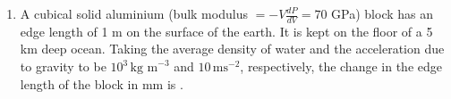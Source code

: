 
\begin{enumerate}
    \item A cubical solid aluminium (bulk modulus $= -V \frac{dP}{dV} = 70$ GPa) block has an edge length of 1 m on the surface of the earth. It is kept on the floor of a 5 km deep ocean. Taking the average density of water and the acceleration due to gravity to be $10^3 \, \text{kg m}^{-3}$ and $10 \, \text{ms}^{-2}$, respectively, the change in the edge length of the block in mm is \underline{\hspace{3cm}}.
\end{enumerate}
